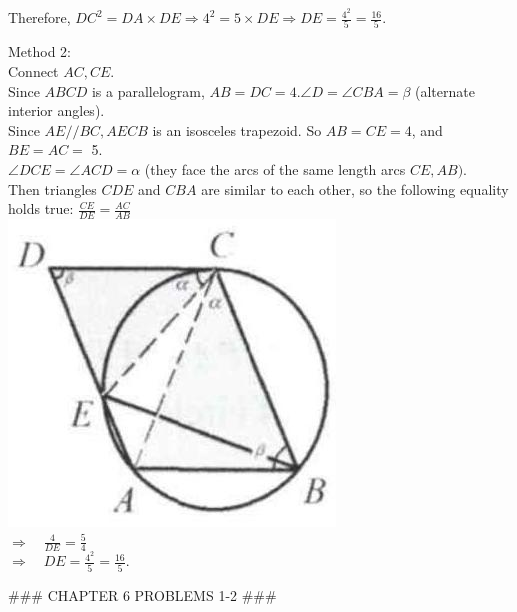 \documentclass[10pt]{article}
\begin{document}
Therefore, \(D C^{2}=D A \times D E \Rightarrow 4^{2}=5 \times D E \Rightarrow D E=\frac{4^{2}}{5}=\frac{16}{5}\).

Method 2:\\
Connect \(A C, C E\).\\
Since \(A B C D\) is a parallelogram, \(A B=D C=4 . \angle D=\angle C B A=\beta\) (alternate interior angles).\\
Since \(A E / / B C, A E C B\) is an isosceles trapezoid. So \(A B=C E=4\), and \(B E=A C=\) 5.\\
\(\angle D C E=\angle A C D=\alpha\) (they face the arcs of the same length arcs \(C E, A B)\).\\
Then triangles \(C D E\) and \(C B A\) are similar to each other, so the following equality holds true: \(\frac{C E}{D E}=\frac{A C}{A B}\)\\
\includegraphics[max width=\textwidth, center]{2025_04_17_97bc1f7e44d93c271a88g-168}\\
\(\Rightarrow \quad \frac{4}{D E}=\frac{5}{4}\)\\
\(\Rightarrow \quad D E=\frac{4^{2}}{5}=\frac{16}{5}\).


### CHAPTER 6 PROBLEMS 1-2 ###
\end{document}
